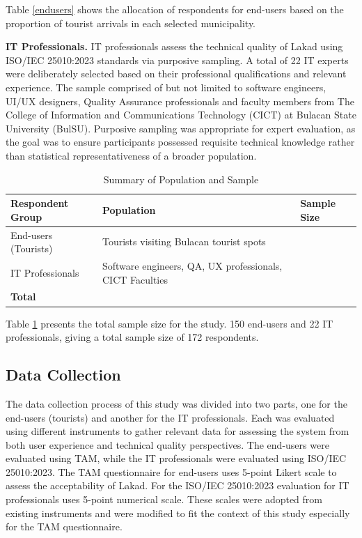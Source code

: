 Table \ref{endusers} shows the allocation of respondents for end-users based on the proportion of tourist arrivals in each selected municipality.
	
\textbf{IT Professionals.} IT professionals assess the technical quality of Lakad using ISO/IEC 25010:2023 standards via purposive sampling. A total of 22 IT experts were deliberately selected based on their professional qualifications and relevant experience. The sample comprised of but not limited to software engineers, UI/UX designers, Quality Assurance professionals and faculty members from The College of Information and Communications Technology (CICT) at Bulacan State University (BulSU). Purposive sampling was appropriate for expert evaluation, as the goal was to ensure participants possessed requisite technical knowledge rather than statistical representativeness of a broader population.

\begin{table}[H]
	\centering
	\singlespacing
	\caption{Summary of Population and Sample}
	\label{pop_sample}
	\renewcommand{\arraystretch}{1.2}
	\begin{tabularx}{\linewidth}{X >{\arraybackslash}X >{\centering\arraybackslash}X}
		\toprule 
		\textbf{Respondent Group} & \textbf{Population} & \textbf{Sample Size} \\
		\midrule
		End-users (Tourists) & Tourists visiting Bulacan tourist spots & 150 \\
		IT Professionals & Software engineers, QA, UX professionals, CICT Faculties & 22 \\
		\midrule
		\textbf{Total} &  & 172 \\
		\bottomrule
	\end{tabularx}
\end{table}

Table \ref{pop_sample} presents the total sample size for the study. 150 end-users and 22 IT professionals, giving a total sample size of 172 respondents.

\subsection{Data Collection}

The data collection process of this study was divided into two parts, one for the end-users (tourists) and another for the IT professionals. Each was evaluated using different instruments to gather relevant data for assessing the system from both user experience and technical quality perspectives. The end-users were evaluated using TAM, while the IT professionals were evaluated using ISO/IEC 25010:2023. The TAM questionnaire for end-users uses 5-point Likert scale to assess the acceptability of Lakad. For the ISO/IEC 25010:2023 evaluation for IT professionals uses 5-point numerical scale. These scales were adopted from existing instruments and were modified to fit the context of this study especially for the TAM questionnaire. 

